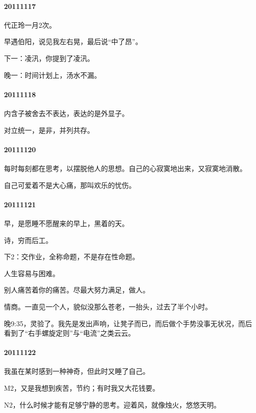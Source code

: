 \documentclass[UTF8]{Diaries}
\begin{document}
\paragraph{20111117}

代正玲一月2次。

早遇伯阳，说见我左右晃，最后说“中了昂”。

下一：凌汛，你提到了凌汛。

晚一：时间计划上，汤水不漏。


\paragraph{20111118}

内含子被舍去不表达，表达的是外显子。

对立统一，是非，并列共存。


\paragraph{20111120}

每时每刻都在思考，以摆脱他人的思想。自己的心寂寞地出来，又寂寞地消散。

自己可爱着不是大心痛，那叫欢乐的忧伤。


\paragraph{20111121}

早，是愿睡不愿醒来的早上，黑着的天。

诗，穷而后工。

下2：交作业，全称命题，不是存在性命题。

人生容易与困难。

别人痛苦着你的痛苦。尽最大努力满足，做人。

情商。一直见一个人，貌似没那么苍老，一抬头，过去了半个小时。

晚9:35，灵验了。我先是发出声响，让凳子而已，而后做个手势没事无状况，而后看到了“右手螺旋定则”与“电流”之类云云。


\paragraph{20111122}

我虽在某时感到一种神奇，但此时又睡了自己。

M2，又是我想到疾苦，节约；有时我又大花钱要。

N2，什么时候才能有足够宁静的思考。迎着风，就像烛火，悠悠天明。
\end{document}
